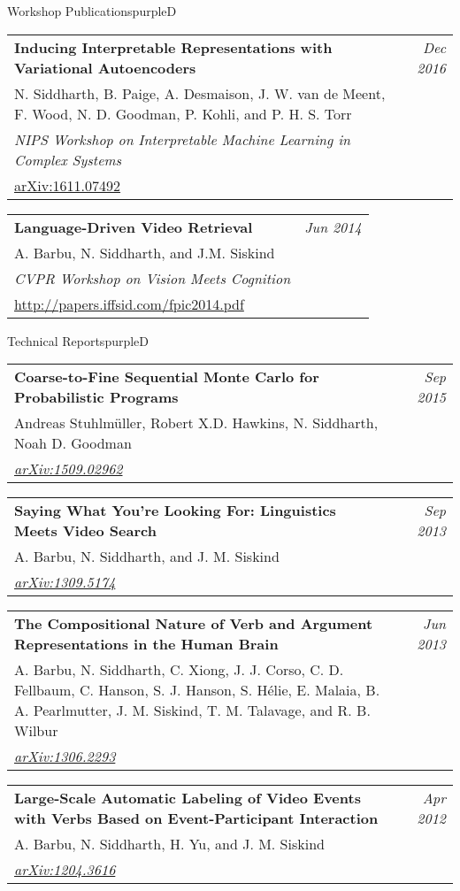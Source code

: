 \documentclass[a4paper]{article}
\makeatletter
\newlength{\itemtextwidth}
\newenvironment{publication}[5]
{ \item
  \begin{tabular*}{\itemtextwidth}{@{}p{5.6in}@{\extracolsep{\fill}}r@{}}
    \textbf{#1} & \textit{#2}\\ #3 &\\ \textit{#4}&\\ #5
  \end{tabular*}
  \vspace*{-2pt}
} {}
\def\item{\addtocounter{enumi}{-2}\oldItem}
\makeatother
\begin{document}
\begin{region}[W][3]{Workshop Publications}{purpleD}
  \begin{publication} {Inducing Interpretable Representations with Variational Autoencoders}
    {Dec 2016}
    {N. Siddharth, B. Paige, A. Desmaison, J. W. van de Meent, F. Wood, N. D.
      Goodman, P. Kohli, and P. H. S. Torr}
    {NIPS Workshop on Interpretable Machine Learning in Complex Systems}
    {\href{http://arxiv.org/abs/1611.07492}{arXiv:1611.07492}}
  \end{publication}
  \begin{publication}{Language-Driven Video Retrieval}
    {Jun 2014}
    {A. Barbu, N. Siddharth, and J.M. Siskind}
    {CVPR Workshop on Vision Meets Cognition}
    {\url{http://papers.iffsid.com/fpic2014.pdf}}
  \end{publication}
\end{region}

\begin{region}[T][4]{Technical Reports}{purpleD}
  \begin{publication} {Coarse-to-Fine Sequential Monte Carlo for Probabilistic Programs}
    {Sep 2015}
    {Andreas Stuhlmüller, Robert X.D. Hawkins, N. Siddharth, Noah D. Goodman}
    {\href{http://arxiv.org/abs/1509.02962}{arXiv:1509.02962}}
    {}
  \end{publication}
  \begin{publication} {Saying What You're Looking For: Linguistics Meets Video Search}
    {Sep 2013}
    {A. Barbu, N. Siddharth, and J. M. Siskind}
    {\href{http://arxiv.org/abs/1309.5174}{arXiv:1309.5174}}
    {}
  \end{publication}
  \begin{publication} {The Compositional Nature of Verb and Argument
      Representations in the Human Brain}
    {Jun 2013}
    {A. Barbu, N. Siddharth, C. Xiong, J. J. Corso, C. D. Fellbaum, C. Hanson, S. J. Hanson, S.
      H\'elie, E. Malaia, B. A. Pearlmutter, J. M. Siskind, T. M. Talavage, and R. B. Wilbur}
    {\href{http://arxiv.org/abs/1306.2293}{arXiv:1306.2293}}
    {}
  \end{publication}
  \begin{publication} {Large-Scale Automatic Labeling of Video Events with
      Verbs Based on Event-Participant Interaction}
    {Apr 2012}
    {A. Barbu, N. Siddharth, H. Yu, and J. M. Siskind}
    {\href{http://arxiv.org/abs/1204.3616}{arXiv:1204.3616}}
    {}
  \end{publication}
\end{region}
\end{document}
